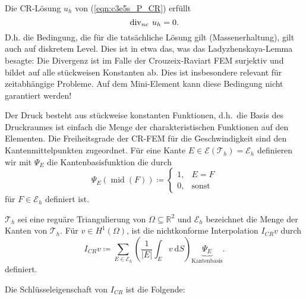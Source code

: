 \documentclass[../skript.tex]{subfiles}
\begin{document}
\begin{remark}\label{rem:c3e5s3}
	Die CR-Lösung $u_h$ von (\ref{eqn:c3e5s_P_CR}) erfüllt
	\[
		\operatorname{div}_{nc}\:u_h = 0.
	\]
	D.h. die Bedingung, die für die tatsächliche Lösung gilt (Massenerhaltung), gilt auch auf diskretem Level. Dies ist in etwa das, was das Ladyzhenskaya-Lemma besagte: Die Divergenz ist im Falle der Crouzeix-Raviart FEM surjektiv und bildet auf alle stückweisen Konstanten ab. Dies ist insbesondere relevant für zeitabhängige Probleme. Auf dem Mini-Element kann diese Bedingung nicht garantiert werden!
\end{remark}


\begin{remark}[Basis]\label{rem:c3e5s4}
	Der Druck besteht aus stückweise konstanten Funktionen, d.h.\ die Basis des Druckraumes ist einfach die Menge der charakteristischen Funktionen auf den Elementen.\newline\noindent
	Die Freiheitsgrade der CR-FEM für die Geschwindigkeit sind den Kantenmittelpunkten zugeordnet. Für eine Kante $E\in\mathcal{E}(\mathcal{T}_h)= \mathcal{E}_h$ definieren wir mit $\Psi_E$ die Kantenbasisfunktion die durch
	\[
		\Psi_E(\operatorname{mid}(F)) \coloneqq \begin{cases}1,&E=F\\0,&\text{sonst}\end{cases}
	\]
	für $F\in\mathcal{E}_h$ definiert ist.
\end{remark}

\begin{definition}\label{def:c3e5s5}
	$\mathcal{T}_h$ sei eine reguäre Triangulierung von $\Omega\subseteq\mathbb{R}^2$ und $\mathcal{E}_h$ bezeichnet die Menge der Kanten von $\mathcal{T}_h$. Für $v\in H^1(\Omega)$, ist die nichtkonforme Interpolation $I_{CR}v$ durch 
	\[
		I_{CR}v \coloneqq \sum_{E\in\mathcal{E}_h} \left( \frac{1}{|E|} \int_E v\:\mathrm{d}S \right)\underbrace{\Psi_E}_{\text{Kantenbasis}}.
	\]
	definiert.
\end{definition}

Die Schlüsseleigenschaft von $I_{CR}$ ist die Folgende:
\end{document}
